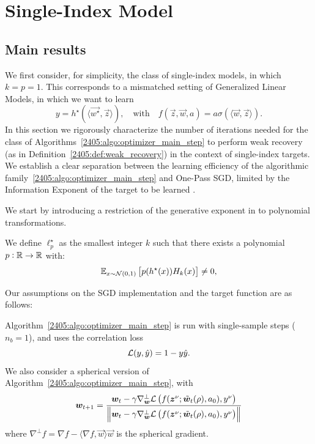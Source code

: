 \section{Single-Index Model}
\subsection{Main results}
We first consider, for simplicity, the class of single-index models, in which $k  =  p  =  1$. This corresponds to a mismatched setting of Generalized Linear Models, in which we want to learn
\[ y = h^\star(\langle \vec{w^\star}, \vec{z} \rangle), \quad \text{with} \quad f(\vec{z}, \vec{w}, a) = a\sigma(\langle \vec{w}, \vec{z} \rangle). \]
In this section we rigorously characterize the number of iterations needed for the class of Algorithms~\ref{2405:algo:optimizer_main_step} to perform weak recovery (as in Definition~\ref{2405:def:weak_recovery}) in the context of single-index targets. We establish a clear separation between the learning efficiency of the algorithmic  family~\ref{2405:algo:optimizer_main_step} and One-Pass SGD, limited by the Information Exponent of the target to be learned \citep{arous2021online}.

We start by introducing a restriction of the generative exponent in \cite{damian2024computational} to polynomial transformations.
\begin{definition}
\label{2405:def:lstar_damian2024}
We define $\ell^\star_p$ as the smallest integer $k$ such that there exists a polynomial $p: \mathbb{R} \rightarrow \mathbb{R}$ with:
\begin{equation}\label{2405:eq:f_hard_gen}
        \mathbb{E}_{x\sim\mathcal{N}(0, 1)}\left[p(h^\star(x))H_{k}(x)\right]\neq 0,
    \end{equation}
\end{definition}

Our assumptions on the SGD implementation and the target function are as follows:
\begin{assumption}\label{2405:assump:spherical_corr}
    Algorithm~\ref{2405:algo:optimizer_main_step} is run with single-sample steps ($n_b = 1$), and uses the correlation loss
    \[ \mathcal{L}(y, \hat y) = 1 - y\hat y.\]
    We also consider a spherical version of Algorithm~\ref{2405:algo:optimizer_main_step}, with
    \begin{equation}\label{2405:eq:spherical_sam}
        {\boldsymbol{w}}_{t+1} = \frac{{\boldsymbol{w}}_{t} - \gamma\nabla^\bot_{{\boldsymbol{w}}}
     \mathcal{L}
    \left(
    f ({\boldsymbol{z}}^\nu; 
    \tilde{{\boldsymbol{w}}}_t(\rho), a_0),  y^\nu  \right)}{\left\lVert {\boldsymbol{w}}_{t} - \gamma\nabla^\bot_{{\boldsymbol{w}}}
     \mathcal{L}
    \left(
    f ({\boldsymbol{z}}^\nu; 
    \tilde{{\boldsymbol{w}}}_t(\rho), a_0),  y^\nu  \right)\right\rVert}
    \end{equation}
    where $\nabla^\bot f = \nabla f - \langle \nabla f, \vec{w} \rangle \vec{w}$ is the spherical gradient.
\end{assumption}

